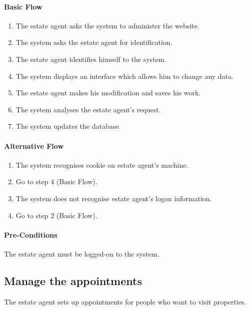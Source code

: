 \documentclass[a4paper,12pt]{article}
\begin{document}
\paragraph{Basic Flow}
\begin{enumerate}
\item The estate agent asks the system to administer the website.
\item The system asks the estate agent for identification.
\item The estate agent identifies himself to the system.
\item The system displays an interface which allows him to change any data.
\item The estate agent makes his modification and saves his work.
\item The system analyses the estate agent's request.
\item The system updates the database.
\end{enumerate}
\paragraph{Alternative Flow}
\begin{enumerate}
\item The system recognises cookie on estate agent's machine.
\item Go to step 4 (Basic Flow).
\item The system does not recognise estate agent's logon information.
\item Go to step 2 (Basic Flow).
\end{enumerate}
\paragraph{Pre-Conditions}
The estate agent must be logged-on to the system.

\subsection{Manage the appointments}
The estate agent sets up appointments for people who want to visit properties.
\end{document}
